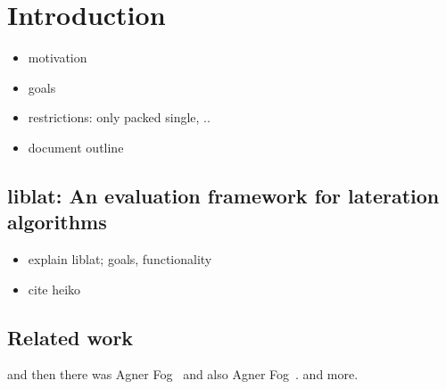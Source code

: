 \section{Introduction} 
\begin{itemize}
\item motivation
\item goals
\item restrictions: only packed single, ..
\item document outline
\end{itemize}
\subsection{liblat: An evaluation framework for lateration algorithms}
\begin{itemize}
\item explain liblat; goals, functionality
\item cite heiko
\end{itemize}
\subsection{Related work}
and then there was Agner Fog~\cite{fog2011optimizing} and also Agner Fog~\cite{fog2011instructiontables}. and more.

